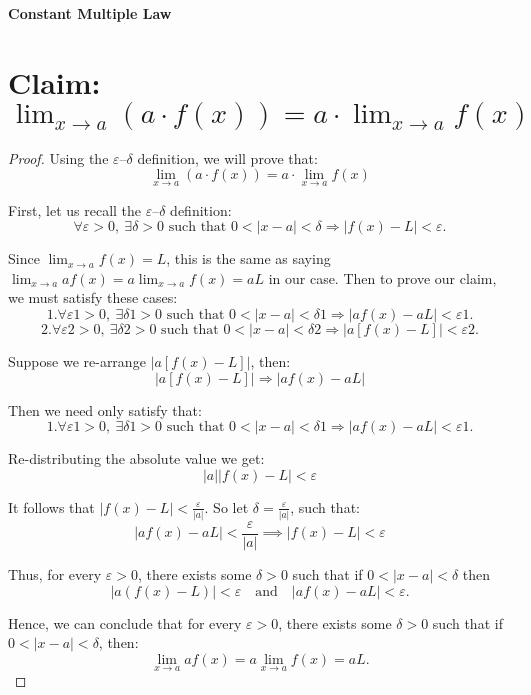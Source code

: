 \documentclass{article}
\begin{document}
	
\textbf{Constant Multiple Law}
	
\section*{Claim: $\lim_{x \to a} \left( a \cdot f(x) \right) = a \cdot \lim_{x \to a} f(x)$}


\begin{proof}


Using the $\varepsilon$–$\delta$ definition, we will prove that:
\[
\lim_{x \to a} \left( a \cdot f(x) \right) = a \cdot \lim_{x \to a} f(x)
\]


First, let us recall the $\varepsilon$–$\delta$ definition:
\[
\forall \varepsilon > 0, \ \exists \delta > 0 \text{ such that } 0 < |x - a| < \delta \Rightarrow \left|f(x) - L\right| < \varepsilon.
\]                                                                                                                                   

Since $\lim_{x \to a} f(x) = L$, this is the same as saying $\lim_{x \to a} a f(x) = a \lim_{x \to a} f(x) = aL$ in our case. Then to prove our claim, we must satisfy these cases:
\[
1.   \forall \varepsilon1 > 0, \ \exists \delta1 > 0 \text{ such that } 0 < |x - a| < \delta1 \Rightarrow \left|a f(x) - aL\right| < \varepsilon1.
\]
\[
2.   \forall \varepsilon2 > 0, \ \exists \delta2 > 0 \text{ such that } 0 < |x - a| < \delta2 \Rightarrow \left|a\left[f(x) - L\right]\right| < \varepsilon2.
\]


Suppose we re-arrange $\left|a\left[f(x) - L\right]\right|$, then:
\[
\left|a\left[f(x) - L\right]\right| \Rightarrow \left|a f(x) - aL\right|
\]


Then we need only satisfy that:
\[
1.   \forall \varepsilon1 > 0, \ \exists \delta1 > 0 \text{ such that } 0 < |x - a| < \delta1 \Rightarrow \left|a f(x) - aL\right| < \varepsilon1.
\]


Re-distributing the absolute value we get:
\[
\left| a \right| \left| f(x) - L \right| < \varepsilon
\]


It follows that $\left| f(x) - L \right| < \frac{\varepsilon}{\left| a \right|}$. So let $\delta = \frac{\varepsilon}{|a|}$, such that:
\[
|a f(x) - a L| < \frac{\varepsilon}{|a|} \implies |f(x) - L| < \varepsilon
\]


Thus, for every $\varepsilon > 0$, there exists some $\delta > 0$ such that if $0 < |x - a| < \delta$ then
\[
|a (f(x) - L)| < \varepsilon \quad \text{and} \quad |a f(x) - a L| < \varepsilon.
\]


Hence, we can conclude that for every $\varepsilon > 0$, there exists some $\delta > 0$ such that if $0 < |x - a| < \delta$, then:
\[
\lim_{x \to a} a f(x) = a \lim_{x \to a} f(x) = a L.
\]





\end{proof}
\end{document}
